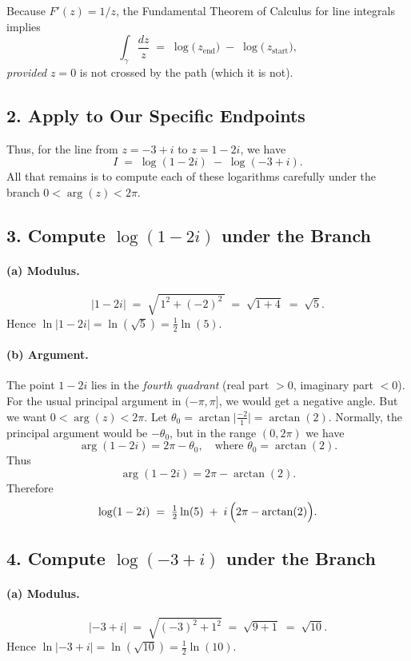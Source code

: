 \documentclass[12pt]{article}
\theoremstyle{definition} %
\theoremstyle{plain} %
\begin{document}
Because $F'(z)=1/z$, the Fundamental Theorem of Calculus for line integrals implies
\[
\int_{\gamma} \frac{dz}{z}
\;=\;
\log\bigl(\,z_{\text{end}}\bigr)
\;-\;
\log\bigl(\,z_{\text{start}}\bigr),
\]
\emph{provided} $z=0$ is not crossed by the path (which it is not).

\subsection*{2. Apply to Our Specific Endpoints}

Thus, for the line from $z=-3+i$ to $z=1-2i$, we have
\[
I \;=\;
\log(1 - 2i)\;-\;\log(-3 + i).
\]
All that remains is to compute each of these logarithms carefully under the branch $0<\arg(z)<2\pi$.

\subsection*{3. Compute \(\log(1-2i)\) under the Branch}

\paragraph{(a) Modulus.}
\[
|1-2i| \;=\;\sqrt{\,1^2 +(-2)^2\,}\;=\;\sqrt{1+4}\;=\;\sqrt{5}.
\]
Hence $\ln|1-2i| = \ln(\sqrt{5}) = \tfrac12 \ln(5).$

\paragraph{(b) Argument.}
The point $1-2i$ lies in the \emph{fourth quadrant} (real part $>0$, imaginary part $<0$). For the usual principal argument in $(-\pi,\pi]$, we would get a negative angle. But we want $0<\arg(z)<2\pi$.  
Let $\theta_0=\arctan\!\bigl|\frac{-2}{1}\bigr|=\arctan(2).$  Normally, the principal argument would be $-\theta_0$, but in the range $(0,2\pi)$ we have
\[
\arg(1-2i) = 2\pi - \theta_0,
\quad
\text{where }\theta_0=\arctan(2).
\]
Thus
\[
\arg(1-2i)=2\pi - \arctan(2).
\]
Therefore
\[
\log(1-2i)
\;=\;
\tfrac12 \ln(5)
\;+\;
i\,\Bigl(2\pi - \arctan(2)\Bigr).
\]

\subsection*{4. Compute \(\log(-3 + i)\) under the Branch}

\paragraph{(a) Modulus.}
\[
|-3 + i|
\;=\;\sqrt{(-3)^2 + 1^2}\;=\;\sqrt{9 + 1}\;=\;\sqrt{10}.
\]
Hence $\ln|-3+i| = \ln(\sqrt{10}) = \tfrac12\ln(10).$
\end{document}
